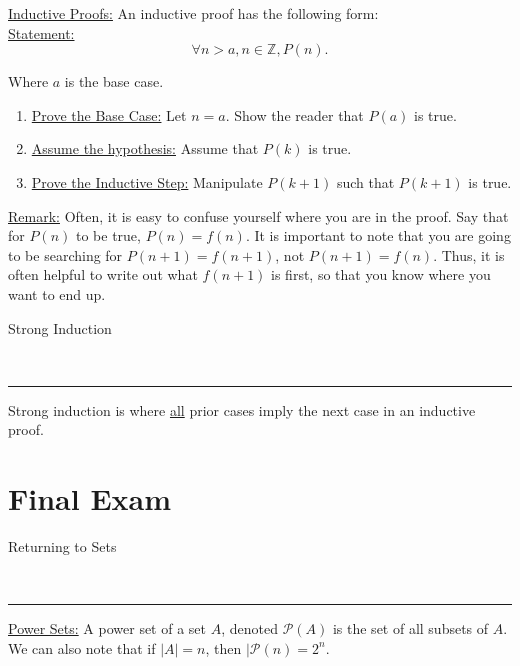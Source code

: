 \documentclass{article}
\newcommand{\header}[1]{\begin{large}\noindent #1\end{large}\\\rule{\textwidth}{0.5pt}}
\newcommand{\gap}{\medskip\\}
\newcommand{\sheader}[1]{\underline{#1:}}
\newcommand{\centertext}[1]{\begin{center}#1\end{center}}
\begin{document}
\sheader{Inductive Proofs} An inductive proof has the following form:
\gap
\sheader{Statement} 
\[
    \forall n > a, n \in \mathbb{Z}, P(n).
\]
\centertext{Where $a$ is the base case.}
\begin{enumerate}
    \item \sheader{Prove the Base Case} Let $n = a$. Show the reader that $P(a)$ is true.
    \item \sheader{Assume the hypothesis} Assume that $P(k)$ is true. 
    \item \sheader{Prove the Inductive Step} Manipulate $P(k + 1)$ such that $P(k + 1)$ is true.
\end{enumerate}
\sheader{Remark} Often, it is easy to confuse yourself where you are in the proof.
Say that for $P(n)$ to be true, $P(n) = f(n)$. It is important to note that you are
going to be searching for $P(n + 1) = f(n + 1)$, not $P(n + 1) = f(n)$. Thus, it is 
often helpful to write out what $f(n + 1)$ is first, so that you know where you want 
to end up.
\gap

\header{Strong Induction}
Strong induction is where \underline{all} prior cases imply the next case in an
inductive proof.

\section*{Final Exam}

\header{Returning to Sets}

\sheader{Power Sets} A power set of a set $A$, denoted $\mathcal{P}(A)$
is the set of all subsets of $A$. We can also note that if $|A| = n$,
then $|\mathcal{P}(n) = 2^n$.
\end{document}
